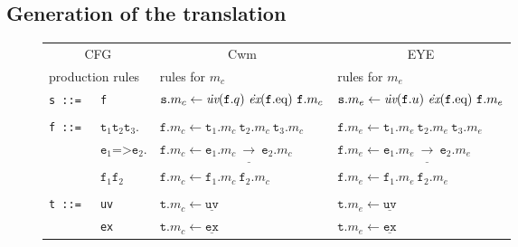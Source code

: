 \subsection{Generation of the translation}\label{all}
\begin{figure*}
\begin{minipage}{\textwidth}
\begin{center}\scriptsize
 \begin{tabular}{llll}
\hline
\multicolumn{2}{c}{CFG}& \multicolumn{1}{c}{Cwm} &\multicolumn{1}{c}{EYE}\\
\multicolumn{2}{l}{production rules}& \multicolumn{1}{l}{rules for $m_c$}&  \multicolumn{1}{l}{rules for $m_e$} \\
  \hline
\texttt{s ::=}&\texttt{f}& $ \texttt{s}.m_c \leftarrow   \dot{\operatorname{\textit{uv}}}(\texttt{f}.q)\  \dot{\operatorname{\textit{ex}}}(\texttt{f}.\eq)\ \texttt{f}.m_c $& $ \texttt{s}.m_e \leftarrow   \dot{\operatorname{\textit{uv}}}(\texttt{f}.u)\  \dot{\operatorname{\textit{ex}}}(\texttt{f}.\eq)\ \texttt{f}.m_e $\\
       &&&\\
\texttt{f ::= } &  $ \texttt{t}_1 \texttt{t}_2 \texttt{t}_3.$&   $ \texttt{f}.m_c \leftarrow \texttt{t}_1.m_c\ \texttt{t}_2.m_c\ \texttt{t}_3.m_c$ &  $ \texttt{f}.m_e \leftarrow \texttt{t}_1.m_e\ \texttt{t}_2.m_e\ \texttt{t}_3.m_e$ \\
    &  $\texttt{e}_1 \texttt{=>}  \texttt{e}_2.$& $\texttt{f}.m_c \leftarrow \texttt{e}_1.m_c\ \underline{\rightarrow}\ \texttt{e}_2.m_c$ & $\texttt{f}.m_e \leftarrow \texttt{e}_1.m_e\ \underline{\rightarrow}\ \texttt{e}_2.m_e$\\
    & $ \texttt{f}_1 \texttt{f}_2$ &                $\texttt{f}.m_c \leftarrow \texttt{f}_1.m_c\ \texttt{f}_2.m_c$ &  $\texttt{f}.m_e \leftarrow \texttt{f}_1.m_e\ \texttt{f}_2.m_e$ \\
&&&\\
\texttt{t ::=}& \texttt{uv}\hspace{0.07\textwidth} &                $\texttt{t}.m_c \leftarrow\underline{\texttt{uv}}$ &   $\texttt{t}.m_e \leftarrow\underline{\texttt{uv}}$ \\
            & \texttt{ex} &               $\texttt{t}.m_c \leftarrow \underline{\texttt{ex}}$&   $\texttt{t}.m_e \leftarrow \underline{\texttt{ex}}$\\

\end{tabular}
\end{center}
\end{minipage}
\end{figure*}
